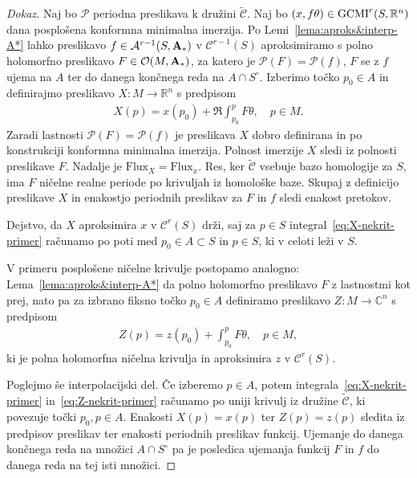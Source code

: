 \documentclass[12pt,a4paper,twoside]{article}
\theoremstyle{definition} %
\newenvironment{dokaz}[1][Dokaz]{\begin{proof}[#1]}{\end{proof}}
\theoremstyle{plain} %
\numberwithin{equation}{section}  %
\begin{document}
\begin{dokaz}
Naj bo $\mathcal{P}$ periodna preslikava k družini $\widetilde{\mathcal{C}}$. 
Naj bo $(x, f\theta) \in \textup{GCMI}^{r}(S, \mathbb{R}^{n})$ dana posplošena konformna minimalna imerzija. Po Lemi~\ref{lema:aproks&interp-A*} lahko preslikavo $f \in \mathcal{A}^{r-1}(S, \textup{\textbf{A}}_{*})$ v $\mathcal{C}^{r-1}(S)$ aproksimiramo s polno holomorfno preslikavo $F \in \mathcal{O}(M, \textup{\textbf{A}}_{*})$, za katero je $\mathcal{P}(F) = \mathcal{P}(f)$, $F$ se z $f$ ujema na $A$ ter do danega končnega reda na $A \cap S^{\circ}$.
Izberimo točko $p_0 \in A$ in definirajmo preslikavo $X \colon M \to \mathbb{R}^{n}$ s predpisom
\begin{gather} \label{eq:X-nekrit-primer}
X(p) = x(p_0) + \Re \int_{p_0}^{p} F\theta, \quad p \in M.
\end{gather}
Zaradi lastnosti $\mathcal{P}(F) = \mathcal{P}(f)$ je preslikava $X$ dobro definirana in po konstrukciji konformna minimalna imerzija. 
Polnost imerzije $X$ sledi iz polnosti preslikave $F$.
Nadalje je $\text{Flux}_{X} = \text{Flux}_{x}$. Res, ker $\widetilde{\mathcal{C}}$ vsebuje bazo homologije za $S$, ima $F$ ničelne realne periode po krivuljah iz homološke baze. Skupaj z definicijo preslikave $X$ in enakostjo periodnih preslikav za $F$ in $f$ sledi enakost pretokov.

Dejstvo, da $X$ aproksimira $x$ v $\mathcal{C}^{r}(S)$ drži, saj za $p \in S$ integral~\eqref{eq:X-nekrit-primer} računamo po poti med $p_0 \in A \subset S$ in $p \in S$, ki v celoti leži v $S$.

V primeru posplošene ničelne krivulje postopamo analogno: Lema~\ref{lema:aproks&interp-A*} da polno holomorfno preslikavo $F$ z lastnostmi kot prej, nato pa za izbrano fiksno točko $p_0 \in A$ definiramo preslikavo $Z \colon M \to \mathbb{C}^{n}$ s predpisom
\begin{gather} \label{eq:Z-nekrit-primer}
Z(p) = z(p_0) + \int_{p_0}^{p} F\theta, \quad p \in M,
\end{gather}
ki je polna holomorfna ničelna krivulja in aproksimira $z$ v $\mathcal{C}^{r}(S)$.

Poglejmo še interpolacijski del.
Če izberemo $p \in A$, potem integrala~\eqref{eq:X-nekrit-primer} in~\eqref{eq:Z-nekrit-primer} računamo po uniji krivulj iz družine $\widetilde{\mathcal{C}}$, ki povezuje točki $p_0, p \in A$.
Enakosti $X(p) = x(p)$ ter $Z(p) = z(p)$ sledita iz predpisov preslikav ter enakosti periodnih preslikav funkcij.
Ujemanje do danega končnega reda na množici $A \cap S^{\circ}$ pa je posledica ujemanja funkcij $F$ in $f$ do danega reda na tej isti množici.
\end{dokaz}
\end{document}
